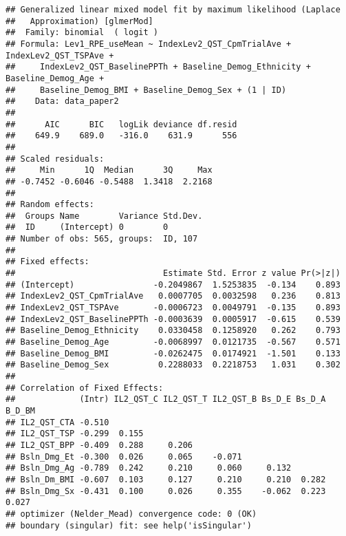 \documentclass[
  12pt,
]{article}
\begin{document}
\begin{verbatim}
## Generalized linear mixed model fit by maximum likelihood (Laplace
##   Approximation) [glmerMod]
##  Family: binomial  ( logit )
## Formula: Lev1_RPE_useMean ~ IndexLev2_QST_CpmTrialAve + IndexLev2_QST_TSPAve +  
##     IndexLev2_QST_BaselinePPTh + Baseline_Demog_Ethnicity + Baseline_Demog_Age +  
##     Baseline_Demog_BMI + Baseline_Demog_Sex + (1 | ID)
##    Data: data_paper2
## 
##      AIC      BIC   logLik deviance df.resid 
##    649.9    689.0   -316.0    631.9      556 
## 
## Scaled residuals: 
##     Min      1Q  Median      3Q     Max 
## -0.7452 -0.6046 -0.5488  1.3418  2.2168 
## 
## Random effects:
##  Groups Name        Variance Std.Dev.
##  ID     (Intercept) 0        0       
## Number of obs: 565, groups:  ID, 107
## 
## Fixed effects:
##                              Estimate Std. Error z value Pr(>|z|)
## (Intercept)                -0.2049867  1.5253835  -0.134    0.893
## IndexLev2_QST_CpmTrialAve   0.0007705  0.0032598   0.236    0.813
## IndexLev2_QST_TSPAve       -0.0006723  0.0049791  -0.135    0.893
## IndexLev2_QST_BaselinePPTh -0.0003639  0.0005917  -0.615    0.539
## Baseline_Demog_Ethnicity    0.0330458  0.1258920   0.262    0.793
## Baseline_Demog_Age         -0.0068997  0.0121735  -0.567    0.571
## Baseline_Demog_BMI         -0.0262475  0.0174921  -1.501    0.133
## Baseline_Demog_Sex          0.2288033  0.2218753   1.031    0.302
## 
## Correlation of Fixed Effects:
##             (Intr) IL2_QST_C IL2_QST_T IL2_QST_B Bs_D_E Bs_D_A B_D_BM
## IL2_QST_CTA -0.510                                                   
## IL2_QST_TSP -0.299  0.155                                            
## IL2_QST_BPP -0.409  0.288     0.206                                  
## Bsln_Dmg_Et -0.300  0.026     0.065    -0.071                        
## Bsln_Dmg_Ag -0.789  0.242     0.210     0.060     0.132              
## Bsln_Dm_BMI -0.607  0.103     0.127     0.210     0.210  0.282       
## Bsln_Dmg_Sx -0.431  0.100     0.026     0.355    -0.062  0.223  0.027
## optimizer (Nelder_Mead) convergence code: 0 (OK)
## boundary (singular) fit: see help('isSingular')
\end{verbatim}
\end{document}
